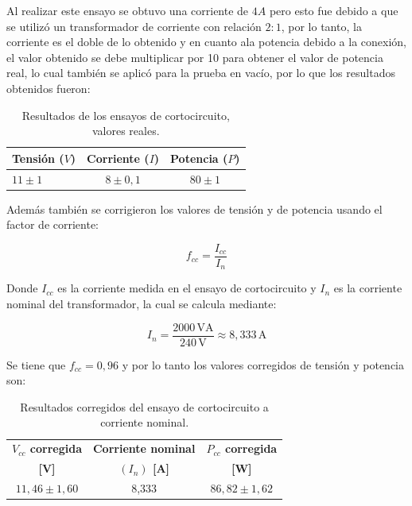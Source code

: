 Al realizar este ensayo se obtuvo una corriente de $4 A$ pero esto fue debido a que se utiliz\'o un transformador de corriente con relaci\'on $2:1$, por lo tanto,
la corriente es el doble de lo obtenido y en cuanto ala potencia debido a la conexi\'on, el valor obtenido se debe multiplicar por 10 para obtener el valor de potencia real, lo cual tambi\'en se aplic\'o para la prueba en vac\'io, por lo que los resultados obtenidos fueron:

\begin{table}[H]
\centering
\caption{Resultados de los ensayos de cortocircuito, valores reales.}
\renewcommand{\arraystretch}{1.3}
\begin{tabular}{lcc}
\toprule
\textbf{Tensión ($V$)} & \textbf{Corriente ($I$)} & \textbf{Potencia ($P$)} \\
\midrule
$11 \pm 1$ & $8 \pm 0,1$ & $80 \pm 1$ \\
\bottomrule
\end{tabular}
\end{table}

Adem\'as tambi\'en se corrigieron los valores de tensi\'on y de potencia usando el factor de corriente:

\begin{equation}
f_{cc}=\frac{I_{cc}}{I_n}
\tag{7.4}
\end{equation}

Donde $I_{cc}$ es la corriente medida en el ensayo de cortocircuito y $I_n$ es la corriente nominal del transformador, la cual se calcula mediante:

\begin{equation}
I_n=\frac{2000\,\mathrm{VA}}{240\,\mathrm{V}}\approx 8,333\,\mathrm{A}
\tag{7.5}
\end{equation}

Se tiene que $f_{cc} = 0,96$ y por lo tanto los valores corregidos de tensi\'on y potencia son:

\begin{table}[H]
\centering
\caption{Resultados corregidos del ensayo de cortocircuito a corriente nominal.}
\renewcommand{\arraystretch}{1.3}
\begin{tabular}{ccc}
\toprule
\textbf{$V_{cc}$ corregida} & \textbf{Corriente nominal} &  \textbf{$P_{cc}$ corregida} \\
\textbf{[V]} &\textbf{$(I_n)$ [A]} &  \textbf{[W]} \\
\midrule
$ 11,46 \pm 1,60$ & 8,333 &  $86,82 \pm 1,62$ \\
\bottomrule
\end{tabular}
\end{table}

